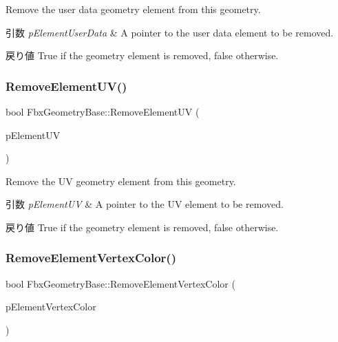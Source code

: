 Remove the user data geometry element from this geometry. 
\begin{DoxyParams}{引数}
{\em p\+Element\+User\+Data} & A pointer to the user data element to be removed. \\
\hline
\end{DoxyParams}
\begin{DoxyReturn}{戻り値}
{\ttfamily True} if the geometry element is removed, {\ttfamily false} otherwise. 
\end{DoxyReturn}
\mbox{\label{class_fbx_geometry_base_a0f571119663cc96a58d42e0e555a9be6}} 
\subsubsection{\texorpdfstring{Remove\+Element\+U\+V()}{RemoveElementUV()}}
{\footnotesize\ttfamily bool Fbx\+Geometry\+Base\+::\+Remove\+Element\+UV (\begin{DoxyParamCaption}\item[{\hyperlink{fbxlayer_8h_a12413531f4bb2c482e3ddbd59e3417e5}{Fbx\+Geometry\+Element\+UV} $\ast$}]{p\+Element\+UV }\end{DoxyParamCaption})}

Remove the UV geometry element from this geometry. 
\begin{DoxyParams}{引数}
{\em p\+Element\+UV} & A pointer to the UV element to be removed. \\
\hline
\end{DoxyParams}
\begin{DoxyReturn}{戻り値}
{\ttfamily True} if the geometry element is removed, {\ttfamily false} otherwise. 
\end{DoxyReturn}
\mbox{\label{class_fbx_geometry_base_a123d97fbece214d31199a63c90eb44e1}} 
\subsubsection{\texorpdfstring{Remove\+Element\+Vertex\+Color()}{RemoveElementVertexColor()}}
{\footnotesize\ttfamily bool Fbx\+Geometry\+Base\+::\+Remove\+Element\+Vertex\+Color (\begin{DoxyParamCaption}\item[{\hyperlink{fbxlayer_8h_a4baddeaf720350758d230973d114f593}{Fbx\+Geometry\+Element\+Vertex\+Color} $\ast$}]{p\+Element\+Vertex\+Color }\end{DoxyParamCaption})}

